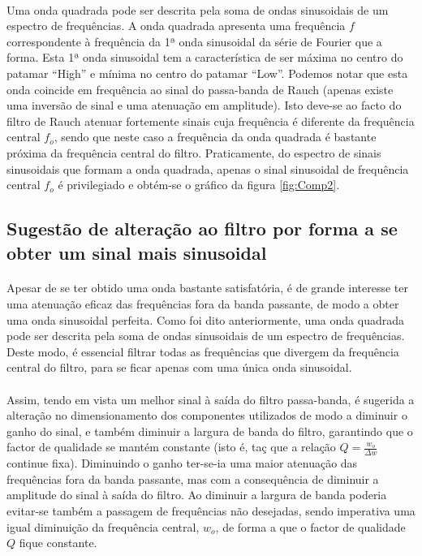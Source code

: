 \documentclass[a4paper,11pt]{report}
\begin{document}
\paragraph{}
Uma onda quadrada pode ser descrita pela soma de ondas sinusoidais de um espectro de frequências. A onda quadrada apresenta uma frequência $f$ correspondente à frequência da 1ª onda sinusoidal da série de Fourier que a forma. Esta 1ª onda sinusoidal tem a característica de ser máxima no centro do patamar ``High'' e mínima no centro do patamar ``Low''. Podemos notar que esta onda coincide em frequência ao sinal do passa-banda de Rauch (apenas existe uma inversão de sinal e uma atenuação em amplitude). Isto deve-se ao facto do filtro de Rauch atenuar fortemente sinais cuja frequência é diferente da frequência central $f_o$, sendo que neste caso a frequência da onda quadrada é bastante próxima da frequência central do filtro. Praticamente, do espectro de sinais sinusoidais que formam a onda quadrada, apenas o sinal sinusoidal de frequência central $f_o$ é privilegiado e obtém-se o gráfico da figura \ref{fig:Comp2}.


\subsection{Sugestão de alteração ao filtro por forma a se obter um sinal mais sinusoidal}

\paragraph{}
Apesar de se ter obtido uma onda bastante satisfatória, é de grande interesse ter uma atenuação eficaz das frequências fora da banda passante, de modo a obter uma onda sinusoidal perfeita. Como foi dito anteriormente, uma onda quadrada pode ser descrita pela soma de ondas sinusoidais de um espectro de frequências. Deste modo, é essencial filtrar todas as frequências que divergem da frequência central do filtro, para se ficar apenas com uma única onda sinusoidal.
\paragraph{}
Assim, tendo em vista um melhor sinal à saída do filtro passa-banda, é sugerida a alteração no dimensionamento dos componentes utilizados de modo a diminuir o ganho do sinal, e também diminuir a largura de banda do filtro, garantindo que o factor de qualidade se mantém constante (isto é, taç que a relação $Q=\frac{w_o}{\Delta w}$ continue fixa). Diminuindo o ganho ter-se-ia uma maior atenuação das frequências fora da banda passante, mas com a consequência de diminuir a amplitude do sinal à saída do filtro. Ao diminuir a largura de banda poderia evitar-se também a passagem de frequências não desejadas, sendo imperativa uma igual diminuição da frequência central, $w_o$, de forma a que o factor de qualidade $Q$ fique constante.
\end{document}

